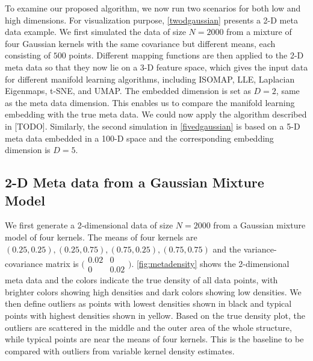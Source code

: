 \documentclass[11pt,a4paper,]{article}
\begin{document}
To examine our proposed algorithm, we now run two scenarios for both low and high dimensions. For visualization purpose, \autoref{twodgaussian} presents a 2-D meta data example. We first simulated the data of size \(N=2000\) from a mixture of four Gaussian kernels with the same covariance but different means, each consisting of \(500\) points. Different mapping functions are then applied to the 2-D meta data so that they now lie on a 3-D feature space, which gives the input data for different manifold learning algorithms, including ISOMAP, LLE, Laplacian Eigenmaps, t-SNE, and UMAP. The embedded dimension is set as \(D=2\), same as the meta data dimension. This enables us to compare the manifold learning embedding with the true meta data. We could now apply the algorithm described in {[}TODO{]}. Similarly, the second simulation in \autoref{fivedgaussian} is based on a 5-D meta data embedded in a 100-D space and the corresponding embedding dimension is \(D=5\).

\hypertarget{twodgaussian}{%
\subsection{2-D Meta data from a Gaussian Mixture Model}\label{twodgaussian}}

We first generate a 2-dimensional data of size \(N=2000\) from a Gaussian mixture model of four kernels. The means of four kernels are \((0.25, 0.25), (0.25, 0.75), (0.75, 0.25), (0.75, 0.75)\) and the variance-covariance matrix is \(\big(\begin{smallmatrix} 0.02&0\\ 0&0.02 \end{smallmatrix}\big)\). \autoref{fig:metadensity} shows the 2-dimensional meta data and the colors indicate the true density of all data points, with brighter colors showing high densities and dark colors showing low densities. We then define outliers as points with lowest densities shown in black and typical points with highest densities shown in yellow. Based on the true density plot, the outliers are scattered in the middle and the outer area of the whole structure, while typical points are near the means of four kernels. This is the baseline to be compared with outliers from variable kernel density estimates.
\end{document}
